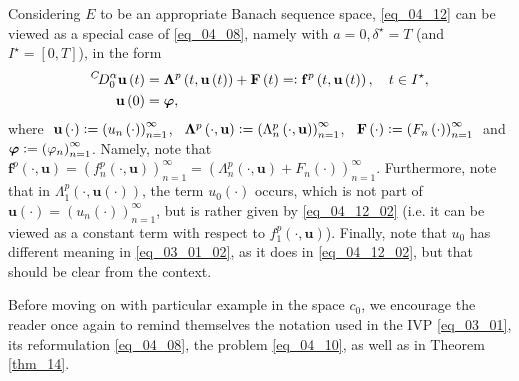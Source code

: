 \documentclass[reqno]{amsart}
\numberwithin{equation}{section}
\theoremstyle{definition}
\theoremstyle{remark}
\newcommand{\bF}{\mathbf{F}}
\newcommand{\bLambda}{\boldsymbol{\Lambda}}
\newcommand{\br}[1]{\left(#1\right)}
\newcommand{\bu}{\mathbf{u}}
\newcommand{\bvarphi}{\boldsymbol{\varphi}}
\newcommand{\DC}[3]{{}^{C}\!D^{#1}_{#2}{#3}}
\newcommand{\defeq}{\vcentcolon=}
\newcommand{\eqdef}{=\vcentcolon}
\newcommand{\sbr}[1]{\left[#1\right]}
\newcommand{\sdelta}{\delta^{\star}}
\newcommand{\sI}{I^{\star}}
\newcommand{\theoremRef}[1]{\textrm{Theorem \ref{#1}}}
\begin{document}
	Considering $E$ to be an appropriate Banach sequence space, \eqref{eq_04_12} can be viewed as a special case of \eqref{eq_04_08}, namely with $a=0,\sdelta=T$ (and $\sI=\sbr{0,T}$), in the form
	\begin{subequations}\label{eq_04_13}
		\begin{align}
			\DC{\alpha}{0}{\bu}\br{t}&=\bLambda^p\br{t,\bu\br{t}}+\bF\br{t}\eqdef\mathbf{f}^p\br{t,\bu\br{t}},\quad{t}\in\sI,\\
			\bu\br{0}&=\bvarphi,
		\end{align}
	\end{subequations}
	where\,\, $\bu\br{\cdot}\defeq\br{u_n\br{\cdot}}_{n=1}^{\infty}$,\,\,\, $\bLambda^p\br{\cdot,\bu}\defeq\br{\Lambda_n^p\br{\cdot,\bu}}_{n=1}^{\infty}$,\,\,\, $\bF\br{\cdot}\defeq\br{F_n\br{\cdot}}_{n=1}^{\infty}$\,\, and $\bvarphi\defeq\br{\varphi_n}_{n=1}^{\infty}$. Namely, note that $\mathbf{f}^p\br{\cdot,\bu}=\br{f_n^p\br{\cdot,\bu}}_{n=1}^{\infty}=\br{\Lambda_n^p\br{\cdot,\bu}+F_n\br{\cdot}}_{n=1}^{\infty}$. Furthermore, note that in $\Lambda_1^p\br{\cdot,\bu\br{\cdot}}$, the term $u_0\br{\cdot}$ occurs, which is not part of $\bu\br{\cdot}=\br{u_n\br{\cdot}}_{n=1}^{\infty}$, but is rather given by \eqref{eq_04_12_02} (i.e. it can be viewed as a constant term with respect to $f_1^p\br{\cdot,\bu}$). Finally, note that $u_0$ has different meaning in \eqref{eq_03_01_02}, as it does in \eqref{eq_04_12_02}, but that should be clear from the context.
	
	Before moving on with particular example in the space $c_0$, we encourage the reader once again to remind themselves the notation used in the IVP \eqref{eq_03_01}, its reformulation \eqref{eq_04_08}, the problem \eqref{eq_04_10}, as well as in \theoremRef{thm_14}.
	
\end{document}
